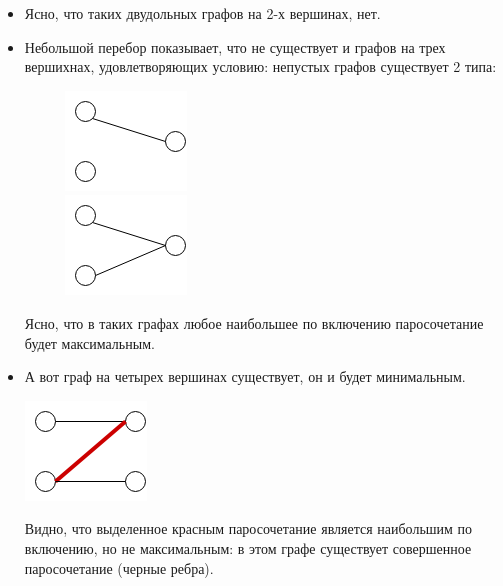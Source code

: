 \documentclass[russian]{article}
\begin{document}
\begin{itemize}
\item Ясно, что таких двудольных графов на 2-х вершинах, нет.
\item Небольшой перебор показывает, что не существует и графов на трех вершихнах, удовлетворяющих условию: непустых графов существует 2 типа:
\begin{figure}[H]
\begin{minipage}[t]{0.5\columnwidth}%
\begin{center}
	\includegraphics[scale=1]{1}
	\par
\end{center}%
\end{minipage}\hfill{}%
\begin{minipage}[t]{0.5\columnwidth}%
\begin{center}
	\includegraphics[scale=1]{2}
	\par
\end{center}%
\end{minipage}\linebreak{}
\end{figure}

Ясно, что в таких графах любое наибольшее по включению паросочетание будет максимальным.

\item А вот граф на четырех вершинах существует, он и будет минимальным.

\begin{center}
	\includegraphics[scale=1]{3}
	\par
\end{center}%

Видно, что выделенное красным паросочетание является наибольшим по включению, но не максимальным: в этом графе существует совершенное паросочетание (черные ребра).

\end{itemize}
\end{document}
